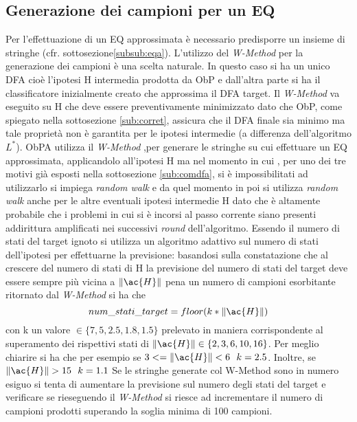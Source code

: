 \subsection[Gen. camp. per EQ]{Generazione dei campioni per un EQ}
\label{sub:ceq}
Per l'effettuazione di un \ac{EQ} approssimata è necessario predisporre un insieme di stringhe (cfr. sottosezione\ref{subsub:eqa}). L'utilizzo del \textit{W-Method} per la generazione dei campioni è una scelta naturale. In questo caso si ha un unico \ac{DFA} cioè l'ipotesi \ac{H} intermedia prodotta da \ac{ObP} e dall'altra parte si ha il classificatore inizialmente creato che approssima il \ac{DFA} target. Il \textit{W-Method} va eseguito su \ac{H} che deve essere preventivamente minimizzato dato che \ac{ObP}, come spiegato nella sottosezione \ref{sub:corret},  assicura che il \ac{DFA} finale sia minimo ma tale proprietà non è garantita per le ipotesi intermedie (a differenza dell'algoritmo $L^{*}$). \ac{ObPA} utilizza il \textit{W-Method} ,per generare le stringhe su cui effettuare un \ac{EQ} approssimata, applicandolo all'ipotesi \ac{H}  ma nel momento in cui , per uno dei tre motivi già esposti nella sottosezione \ref{sub:comdfa}, si è impossibilitati ad utilizzarlo si impiega \textit{random walk} e da quel momento in poi si utilizza \textit{random walk} anche per le altre eventuali ipotesi intermedie \ac{H} dato che è altamente probabile che i problemi in cui si è incorsi al passo corrente siano presenti addirittura amplificati nei successivi \textit{round} dell'algoritmo.  Essendo il numero di stati del target ignoto si utilizza un algoritmo adattivo sul numero di stati dell'ipotesi per effettuarne la previsione: basandosi sulla constatazione che al crescere del numero di stati di \ac{H} la previsione del numero di stati del target deve essere sempre più vicina a $\norma{\ac{H}}$ pena un numero di campioni esorbitante ritornato dal \textit{W-Method} si ha che 
\begin{equation*}
num\_stati\_target = floor(k * \norma{\ac{H}})
\end{equation*}
con k un valore $\in \{7,5,2.5,1.8,1.5\}$ prelevato in maniera corrispondente al superamento dei rispettivi stati di $\norma{\ac{H}} \in \{2,3,6,10,16\}$. Per meglio chiarire si ha che per esempio se $3<=\norma{\ac{H}}<6  \: \: \: k=2.5$.  Inoltre, se  $\norma{\ac{H}}>15 \: \: \: k=1.1$ 
Se le stringhe generate col W-Method sono in numero esiguo si tenta di aumentare la previsione sul numero degli stati del target e verificare se rieseguendo il \textit{W-Method} si riesce ad incrementare il numero di campioni prodotti superando la soglia minima di 100 campioni.

